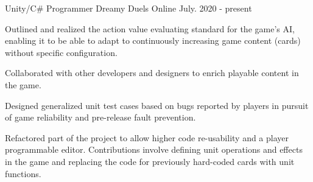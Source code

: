 

\begin{cventries}

  \cventry
    {Unity/C\# Programmer} %
    {Dreamy Duels} %
    {Online} %
    {July. 2020 - present} %
    {
      \begin{cvitems} %
		\item Outlined and realized the action value evaluating standard for the game’s AI, enabling it to be able to adapt to continuously increasing game content (cards) without specific configuration.
		\item Collaborated with other developers and designers to enrich playable content in the game.
		\item Designed generalized unit test cases based on bugs reported by players in pursuit of game reliability and pre-release fault prevention.
		\item Refactored part of the project to allow higher code re-usability and a player programmable editor. Contributions involve defining unit operations and effects in the game and replacing the code for previously hard-coded cards with unit functions.
      \end{cvitems}
    }

\end{cventries}
